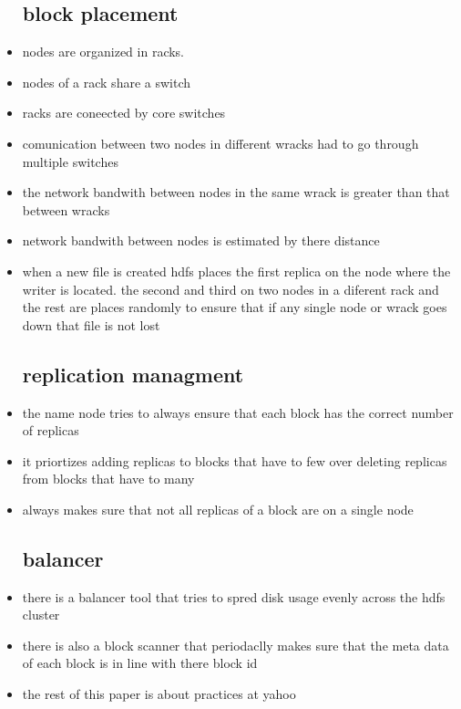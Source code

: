\documentclass{article}
\begin{document}
\begin{itemize}
\subsection*{block placement}
\item nodes are organized in racks. 
\item nodes of a rack share a switch 
\item racks are coneected by core switches
\item comunication between two nodes in different wracks had to go through multiple switches
\item the network bandwith between nodes in the same wrack is greater than that between wracks
\item network bandwith between nodes is estimated by there distance
\item when a new file is created hdfs places the first replica on the node where the writer is located. the second and third on two nodes in a diferent rack and the rest are places randomly to ensure that if any single node or wrack goes down that file is not lost 
\subsection*{replication managment }
\item the name node tries to always ensure that each block has the correct number of replicas
\item it priortizes adding replicas to blocks that have to few over deleting replicas from blocks that have to many
\item always makes sure that not all replicas of a block are on a single node
\subsection*{balancer}
\item there is a balancer tool that tries to spred disk usage evenly across the hdfs cluster
\item there is also a block scanner that periodaclly makes sure that the meta data of each block is in line with there block id 
\item the rest of this paper is about practices at yahoo



\end{itemize}
\end{document}
